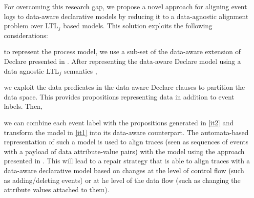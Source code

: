 
For overcoming this research gap, we propose a novel approach for aligning event logs to data-aware declarative models by reducing it to a data-agnostic alignment problem over LTL$_f$ based models. This solution exploits the following considerations: \begin{enumerate*}[label=\emph{\alph*})]
	\item \label{it1} to represent the process model, we use a sub-set of the data-aware extension of Declare presented in \cite{}. After representing the data-aware Declare model using a data agnostic LTL$_f$ semantics \cite{10.1007/978-3-642-40176-3_8},
	\item \label{it2} we exploit the data predicates in the data-aware Declare clauses to partition the data space. This provides propositions representing data in addition to event labels. Then,
	\item we can combine each event label with the propositions generated in \ref{it2} and transform the model in \ref{it1} into its data-aware counterpart. The automata-based representation of such a model is used to align traces (seen as sequences of events with a payload of data attribute-value pairs) with the model using the approach presented in \cite{XuLZ17a}. This will lead to a repair strategy that is able to align traces with a data-aware declarative model based on changes at the level of control flow (such as adding/deleting events) or at he level of the data flow (such as changing the attribute values attached to them).
\end{enumerate*}

